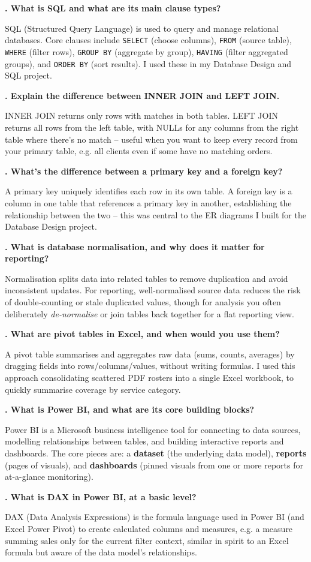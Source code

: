 \documentclass[10.5pt]{article}
\newcounter{qnum}
\newcommand{\qa}[2]{%
  \stepcounter{qnum}%
  \textbf{\theqnum. #1}\par
  #2\par
  \vspace{6pt}
}
\begin{document}
\qa{What is SQL and what are its main clause types?}{SQL (Structured Query Language) is used to query and manage relational databases. Core clauses include \texttt{SELECT} (choose columns), \texttt{FROM} (source table), \texttt{WHERE} (filter rows), \texttt{GROUP BY} (aggregate by group), \texttt{HAVING} (filter aggregated groups), and \texttt{ORDER BY} (sort results). I used these in my Database Design and SQL project.}

\qa{Explain the difference between INNER JOIN and LEFT JOIN.}{INNER JOIN returns only rows with matches in both tables. LEFT JOIN returns all rows from the left table, with NULLs for any columns from the right table where there's no match -- useful when you want to keep every record from your primary table, e.g. all clients even if some have no matching orders.}

\qa{What's the difference between a primary key and a foreign key?}{A primary key uniquely identifies each row in its own table. A foreign key is a column in one table that references a primary key in another, establishing the relationship between the two -- this was central to the ER diagrams I built for the Database Design project.}

\qa{What is database normalisation, and why does it matter for reporting?}{Normalisation splits data into related tables to remove duplication and avoid inconsistent updates. For reporting, well-normalised source data reduces the risk of double-counting or stale duplicated values, though for analysis you often deliberately \emph{de-normalise} or join tables back together for a flat reporting view.}

\qa{What are pivot tables in Excel, and when would you use them?}{A pivot table summarises and aggregates raw data (sums, counts, averages) by dragging fields into rows/columns/values, without writing formulas. I used this approach consolidating scattered PDF rosters into a single Excel workbook, to quickly summarise coverage by service category.}

\qa{What is Power BI, and what are its core building blocks?}{Power BI is a Microsoft business intelligence tool for connecting to data sources, modelling relationships between tables, and building interactive reports and dashboards. The core pieces are: a \textbf{dataset} (the underlying data model), \textbf{reports} (pages of visuals), and \textbf{dashboards} (pinned visuals from one or more reports for at-a-glance monitoring).}

\qa{What is DAX in Power BI, at a basic level?}{DAX (Data Analysis Expressions) is the formula language used in Power BI (and Excel Power Pivot) to create calculated columns and measures, e.g. a measure summing sales only for the current filter context, similar in spirit to an Excel formula but aware of the data model's relationships.}
\end{document}
